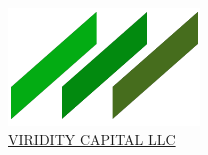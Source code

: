 \begin{titlepage}
  \begin{flushright}
    {\huge\textbf{\projectname{}}}\\
    \vspace{12pt}
    {\large \projectDescription} \\
  \end{flushright}

  \vspace{3.0in}
  \begin{center}
    \href{\website}{\includegraphics[width=2.0in]{logo.png}}\\
    \href{\website}{\Huge{VIRIDITY CAPITAL LLC}}
  \end{center}

\end{titlepage}